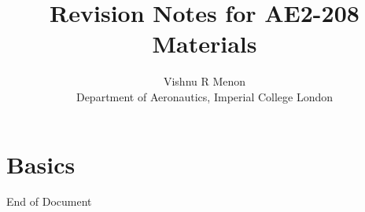 \documentclass{summary_notes}
\begin{document}
\title{\bf Revision Notes for AE2-208 Materials}
\author{Vishnu R Menon\\ 
\small{Department of Aeronautics, Imperial College London}}
\maketitle
\begin{multicols*}{2}
\tableofcontents
\end{multicols*}
\newpage


\chapter{Basics}
\begin{multicols*}{2}





\end{multicols*}
\newpage
End of Document
\end{document}
